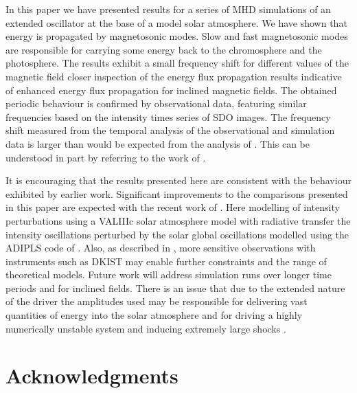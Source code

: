 \documentclass[linenumbers]{aastex63}
\begin{document}
In this paper we have presented results for a series of MHD simulations of an extended oscillator at the base of a model solar atmosphere. We have shown that energy is propagated by magnetosonic modes. Slow and fast magnetosonic modes are responsible for carrying some energy back to the chromosphere and the photosphere. The results exhibit a small frequency shift  for different values of the magnetic field closer inspection of the energy flux propagation results indicative of enhanced energy flux propagation for inclined magnetic fields. The obtained periodic behaviour is confirmed by observational data, featuring similar frequencies based on the intensity times series of SDO images. The frequency shift measured from the temporal analysis of the observational and simulation data is larger than would be expected from the analysis of \citet{Hindman1996}. This can be understood in part by referring to the work of \citet{Campbell1989}.


It is encouraging that the results presented here are consistent with the behaviour exhibited  by earlier work. Significant improvements to the comparisons presented in this paper are expected with the  recent work of \citet{Kostogryz2021}. Here modelling of intensity perturbations using a VALIIIc solar atmosphere model with radiative transfer the intensity oscillations perturbed by the solar global oscillations modelled using the ADIPLS code of \citet{Christensen-Dalsgaard2008}. Also, as described in \citet{Rast2016}, more sensitive observations with instruments such as DKIST may enable further constraints and the range of theoretical models. Future work will address simulation runs over longer time periods and for inclined fields. There is an issue that due to the extended nature of the driver the amplitudes used may be responsible for delivering vast quantities of energy into the solar atmosphere and for driving a highly numerically unstable system and inducing extremely large shocks \citet{Santamaria2015}. 


\section{Acknowledgments}
\end{document}
